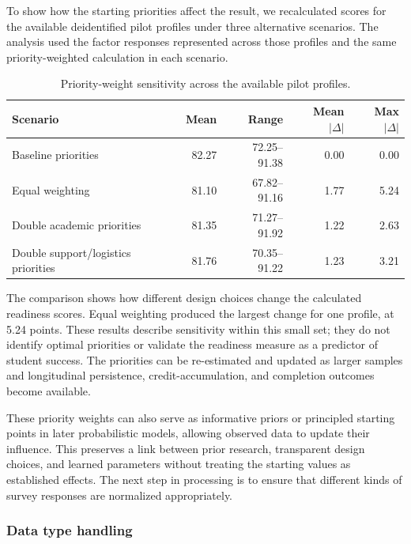 \documentclass[letterpaper,11pt]{article}
\begin{document}
To show how the starting priorities affect the result, we recalculated scores for the available deidentified pilot profiles under three alternative scenarios. The analysis used the factor responses represented across those profiles and the same priority-weighted calculation in each scenario.

\begin{table}[htbp]
\caption{Priority-weight sensitivity across the available pilot profiles.}
\label{tab:sensitivity}
\centering
\begin{tabular}{@{}p{4.1cm}rrrr@{}}
\toprule
\textbf{Scenario} & \textbf{Mean} & \textbf{Range} & \textbf{Mean $|\Delta|$} & \textbf{Max $|\Delta|$} \\
\midrule
Baseline priorities & 82.27 & 72.25--91.38 & 0.00 & 0.00 \\
Equal weighting & 81.10 & 67.82--91.16 & 1.77 & 5.24 \\
Double academic priorities & 81.35 & 71.27--91.92 & 1.22 & 2.63 \\
Double support/logistics priorities & 81.76 & 70.35--91.22 & 1.23 & 3.21 \\
\bottomrule
\end{tabular}
\end{table}

The comparison shows how different design choices change the calculated readiness scores. Equal weighting produced the largest change for one profile, at 5.24 points. These results describe sensitivity within this small set; they do not identify optimal priorities or validate the readiness measure as a predictor of student success. The priorities can be re-estimated and updated as larger samples and longitudinal persistence, credit-accumulation, and completion outcomes become available.

These priority weights can also serve as informative priors or principled starting points in later probabilistic models, allowing observed data to update their influence. This preserves a link between prior research, transparent design choices, and learned parameters without treating the starting values as established effects. The next step in processing is to ensure that different kinds of survey responses are normalized appropriately.

\subsubsection{Data type handling}
\end{document}
